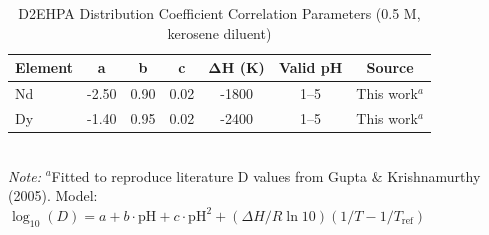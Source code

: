 \begin{table}[htbp]
\centering
\caption{D2EHPA Distribution Coefficient Correlation Parameters (0.5 M, kerosene diluent)}
\label{tab:correlation}
\begin{tabular}{lcccccc}
\toprule
Element & a & b & c & ΔH (K) & Valid pH & Source \\
\midrule
Nd & -2.50 & 0.90 & 0.02 & -1800 & 1--5 & This work$^a$ \\
Dy & -1.40 & 0.95 & 0.02 & -2400 & 1--5 & This work$^a$ \\
\bottomrule
\end{tabular}
\\[0.5em]
\footnotesize{\textit{Note:} $^a$Fitted to reproduce literature D values from Gupta \& Krishnamurthy (2005). Model: $\log_{10}(D) = a + b \cdot \text{pH} + c \cdot \text{pH}^2 + (\Delta H / R \ln 10)(1/T - 1/T_{\text{ref}})$}
\end{table}